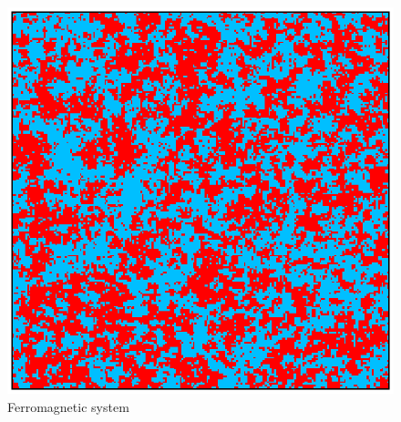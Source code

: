 \begin{figure}[h]
\begin{minipage}[c]{0.45\textwidth}
    \end{minipage}
    \hfill
    \begin{minipage}[c]{\textwidth}
        \centering
        \includegraphics[scale=0.45]{./images/ising/T_065_ferro.eps}
    \end{minipage}
    \caption{Ferromagnetic system}
    \label{fig:MC_single_final_state_ferro}
\end{figure}
